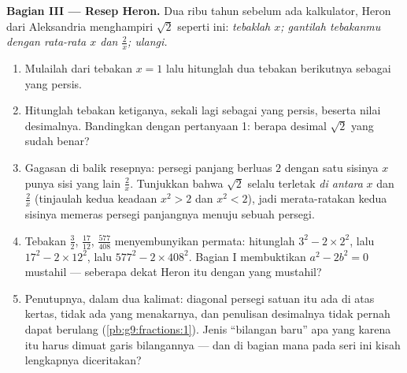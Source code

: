 \begin{problem}
\medskip
\noindent\textbf{Bagian III --- Resep Heron.}
Dua ribu tahun sebelum ada kalkulator, Heron dari Aleksandria
menghampiri $\sqrt2$ seperti ini: \emph{tebaklah $x$; gantilah
tebakanmu dengan rata-rata $x$ dan $\frac2x$; ulangi.}
\begin{enumerate}[resume]
  \item Mulailah dari tebakan $x = 1$ lalu hitunglah dua tebakan
        berikutnya sebagai  yang persis.
  \item Hitunglah tebakan ketiganya, sekali lagi sebagai 
        yang persis, beserta nilai desimalnya. Bandingkan dengan
        pertanyaan 1: berapa desimal $\sqrt2$ yang sudah benar?
  \item Gagasan di balik resepnya: persegi panjang berluas $2$
        dengan satu sisinya $x$ punya sisi yang lain $\frac2x$.
        Tunjukkan bahwa $\sqrt2$ selalu terletak \emph{di antara}
        $x$ dan $\frac2x$ (tinjaulah kedua keadaan $x^2 > 2$ dan
        $x^2 < 2$), jadi merata-ratakan kedua sisinya memeras
        persegi panjangnya menuju sebuah persegi.
  \item Tebakan $\frac32$, $\frac{17}{12}$,
        $\frac{577}{408}$ menyembunyikan permata: hitunglah
        $3^2 - 2 \times 2^2$, lalu $17^2 - 2 \times 12^2$, lalu
        $577^2 - 2 \times 408^2$. Bagian I membuktikan
        $a^2 - 2b^2 = 0$ mustahil --- seberapa dekat  Heron
        itu dengan yang mustahil?
  \item Penutupnya, dalam dua kalimat: diagonal persegi satuan itu
        ada di atas kertas, tidak ada  yang menakarnya, dan
        penulisan desimalnya tidak pernah dapat berulang
        (\cref{pb:g9:fractions:1}). Jenis ``bilangan baru'' apa yang
        karena itu harus dimuat garis bilangannya --- dan di bagian
        mana pada seri ini kisah lengkapnya diceritakan?

\end{enumerate}
\end{problem}
